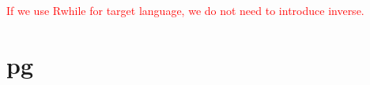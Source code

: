 \documentclass[runningheads]{llncs}
\newcommand{\product}[2]{#1 \ prod \ #2}
\newcommand{\tuple}[2]{(#1 :: #2)}
\newcommand{\rearrS}[2]{rearrS \ #1 \ #2}
\newcommand{\rearrV}[2]{rearrV \ #1 \ #2}
\newcommand{\casebx}[6]{case [#1][#2] \to #3, [#4][#5] \to #6}
\newcommand{\revget}[2]{get$_{REV}$ \ {#1} \ {#2}}
\begin{document}






\textcolor{red}{If we use Rwhile for target language, we do not need to introduce inverse.}

\section{pg}
\end{document}
